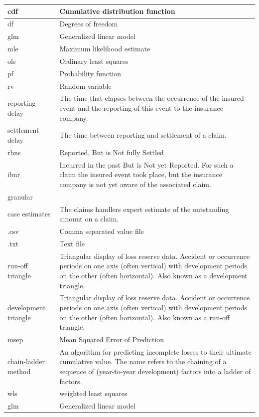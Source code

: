 \documentclass[
]{book}
\begin{document}
\begin{longtable}{>{\raggedright\arraybackslash}p{10em}|>{\raggedright\arraybackslash}p{30em}}
\hline
cdf & Cumulative distribution function\\
\hline
df & Degrees of freedom\\
\hline
glm & Generalized linear \vphantom{1} model\\
\hline
mle & Maximum likelihood estimate\\
\hline
ols & Ordinary least squares\\
\hline
pf & Probability function\\
\hline
rv & Random variable\\
\hline
reporting delay & The time that elapses between the occurrence of the insured event and the reporting of this event to the insurance company.\\
\hline
settlement delay & The time between reporting and settlement of a claim.\\
\hline
rbns & Reported, But is Not fully Settled\\
\hline
ibnr & Incurred in the past But is Not yet Reported. For such a claim the insured event took place, but the insurance company is not yet aware of the associated claim.\\
\hline
granular & \\
\hline
case estimates & The claims handlers expert estimate of the outstanding amount on a claim.\\
\hline
.csv & Comma separated value file\\
\hline
.txt & Text file\\
\hline
run-off triangle & Triangular display of loss reserve data. Accident or occurrence periods on one axis (often vertical) with development periods on the other (often horizontal). Also known as a development triangle.\\
\hline
development triangle & Triangular display of loss reserve data. Accident or occurrence periods on one axis (often vertical) with development periods on the other (often horizontal). Also known as a run-off triangle.\\
\hline
msep & Mean Squared Error of Prediction\\
\hline
chain-ladder method & An algorithm for predicting incomplete losses to their ultimate cumulative value. The name refers to the chaining of a sequence of (year-to-year development) factors into a ladder of factors.\\
\hline
wls & weighted least squares\\
\hline
glm & Generalized linear model\\
\hline
\end{longtable}

  
\end{document}
